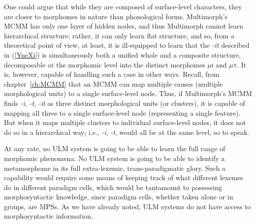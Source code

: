 One could argue that while they are composed of surface-level characters,
they are closer to morphomes in nature than phonological forms.
 Multimorph's \ac{MCMM} has only one layer of hidden nodes,
and thus Multimorph cannot learn hierarchical structure; rather, it can only learn 
flat structure, and so, from a theoretical point of view, at least, it is ill-equipped to learn
that the \textit{-it} described in (\ref{YneXi}) is simultaneously 
both a unified whole and a composite structure,
decomposable at the morphomic level into the distinct morphomes 
$\mu$\textsc{i} and $\mu$\textsc{t}.
It is, however, capable of handling such a case in other ways. 
Recall, from chapter~\ref{ch:MCMM} 
that an \ac{MCMM} can map multiple causes (multiple morphological units)
 to a single surface-level node. Thus, if Multimorph's \ac{MCMM} finds 
 \textit{-i}, \textit{-t}, \textit{-it} as three distinct
 morphological units (or clusters), it is capable of mapping all three 
 to a single surface-level node (representing a single feature). 
 But when it maps multiple clusters to individual surface-level nodes, 
 it does not do so in a hierarchical way; i.e., \textit{-i}, \textit{-t},  would
 all be at the same level, so to speak.


At any rate, no \ac{ULM} system is going to be able to learn the full range of morphomic
phenomena. No \ac{ULM} system is going to be able to identify a metamorphome in its full
 extra-lexemic, trans-paradigmatic glory. Such a capability would require some means
of keeping track of what different lexemes do in different paradigm cells, which would be tantamount
to possessing morphosyntactic knowledge, since paradigm cells, whether taken alone or in groups,
are \ac{MPS}s. As we have already noted, \ac{ULM} systems do not
have access to morphosyntactic information.


